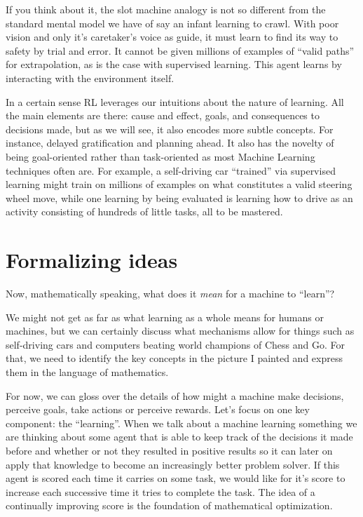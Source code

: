 If you think about it, the slot machine analogy is not so 
different from the standard mental model we have of say an 
infant learning to crawl.  With poor vision and only it's 
caretaker's voice as guide, it must learn to find its way to 
safety by trial and error. It cannot be given millions of 
examples of ``valid paths'' for extrapolation, as is the case 
with supervised learning. This agent learns by interacting with 
the environment itself.

In a certain sense RL leverages our intuitions about the nature 
of learning. All the main elements are there: cause and effect, 
goals, and consequences to decisions made, but as we will see, 
it also encodes more subtle concepts. For instance, delayed 
gratification and planning ahead. It also has the novelty of 
being goal-oriented rather than task-oriented as most Machine 
Learning techniques often are. For example, a self-driving car 
``trained'' via supervised learning might train on millions of 
examples on what constitutes a valid steering wheel move, while 
one learning by being evaluated is learning how to drive as an 
activity consisting of hundreds of little tasks, all to be 
mastered.

\section{Formalizing ideas}
Now, mathematically speaking, what does it \textit{mean} for a 
machine to ``learn''?

We might not get as far as what learning as a whole means for 
humans or machines, but we can certainly discuss what mechanisms 
allow for things such as self-driving cars and computers beating 
world champions of Chess and Go. For that, we need to identify 
the key concepts in the picture I painted and express them in 
the language of mathematics.

For now, we can gloss over the details of how might a machine 
make decisions, perceive goals, take actions or perceive 
rewards. Let's focus on one key component: the ``learning''. 
When we talk about a machine learning something we are thinking 
about some agent that is able to keep track of the decisions it 
made before and whether or not they resulted in positive results 
so it can later on apply that knowledge to become an 
increasingly better problem solver. If this agent is scored each 
time it carries on some task, we would like for it's score to 
increase each successive time it tries to complete the task. The 
idea of a continually improving score is the foundation of 
mathematical optimization.

